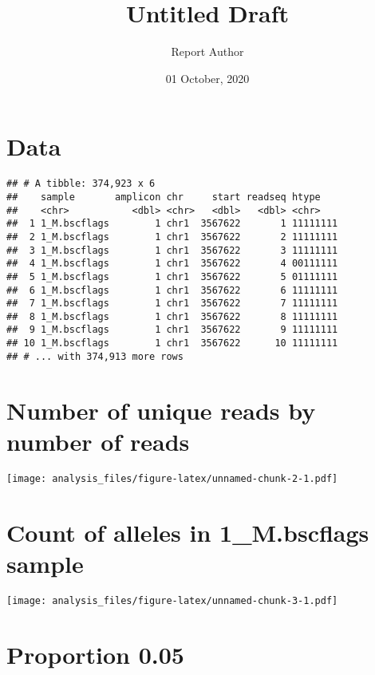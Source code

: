 \documentclass[
]{article}
\title{Untitled Draft}
\author{Report Author}
\date{01 October, 2020}
\begin{document}
\maketitle

\hypertarget{data}{%
\section{Data}\label{data}}

\begin{verbatim}
## # A tibble: 374,923 x 6
##    sample       amplicon chr     start readseq htype   
##    <chr>           <dbl> <chr>   <dbl>   <dbl> <chr>   
##  1 1_M.bscflags        1 chr1  3567622       1 11111111
##  2 1_M.bscflags        1 chr1  3567622       2 11111111
##  3 1_M.bscflags        1 chr1  3567622       3 11111111
##  4 1_M.bscflags        1 chr1  3567622       4 00111111
##  5 1_M.bscflags        1 chr1  3567622       5 01111111
##  6 1_M.bscflags        1 chr1  3567622       6 11111111
##  7 1_M.bscflags        1 chr1  3567622       7 11111111
##  8 1_M.bscflags        1 chr1  3567622       8 11111111
##  9 1_M.bscflags        1 chr1  3567622       9 11111111
## 10 1_M.bscflags        1 chr1  3567622      10 11111111
## # ... with 374,913 more rows
\end{verbatim}

\hypertarget{number-of-unique-reads-by-number-of-reads}{%
\section{Number of unique reads by number of
reads}\label{number-of-unique-reads-by-number-of-reads}}

\texttt{[image: analysis\_files/figure-latex/unnamed-chunk-2-1.pdf]}

\hypertarget{count-of-alleles-in-1_m.bscflags-sample}{%
\section{Count of alleles in 1\_M.bscflags
sample}\label{count-of-alleles-in-1_m.bscflags-sample}}

\texttt{[image: analysis\_files/figure-latex/unnamed-chunk-3-1.pdf]}

\hypertarget{proportion-0.05}{%
\section{Proportion 0.05}\label{proportion-0.05}}
\end{document}
